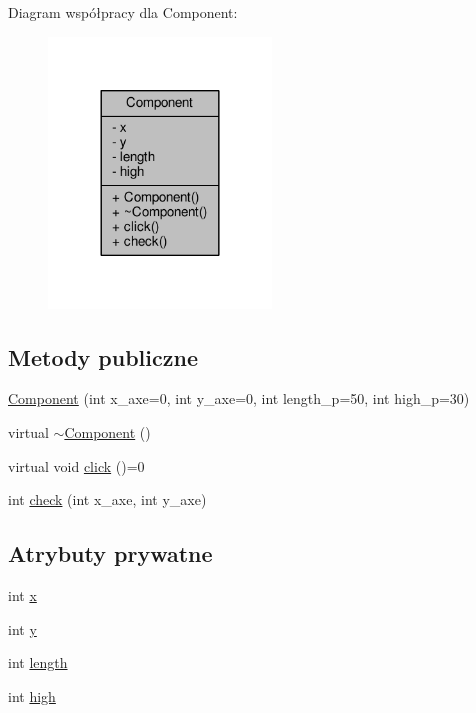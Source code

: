 Diagram współpracy dla Component\+:\nopagebreak
\begin{figure}[H]
\begin{center}
\leavevmode
\includegraphics[width=168pt]{classComponent__coll__graph}
\end{center}
\end{figure}
\subsection*{Metody publiczne}
\begin{DoxyCompactItemize}
\item 
\hyperlink{classComponent_a24ce4a41eb6f0c89a8d874e19dcc46eb}{Component} (int x\+\_\+axe=0, int y\+\_\+axe=0, int length\+\_\+p=50, int high\+\_\+p=30)
\item 
virtual \hyperlink{classComponent_a2e9aa4348314d981f05f67397ad2f872}{$\sim$\+Component} ()
\item 
virtual void \hyperlink{classComponent_a247f6f0204b68a7efb9059cf709fe6ea}{click} ()=0
\item 
int \hyperlink{classComponent_abbe0759c6c9476750a086fe620d322d7}{check} (int x\+\_\+axe, int y\+\_\+axe)
\end{DoxyCompactItemize}
\subsection*{Atrybuty prywatne}
\begin{DoxyCompactItemize}
\item 
int \hyperlink{classComponent_a3fe84cea3e41ac363349595e1a92a5b6}{x}
\item 
int \hyperlink{classComponent_a3cbb2a0f076a05810ad64ac22ea10402}{y}
\item 
int \hyperlink{classComponent_a4d25a50d4bfa8fde7f75478eadcd5661}{length}
\item 
int \hyperlink{classComponent_aff8a286217041306964f2207b86522b3}{high}
\end{DoxyCompactItemize}



